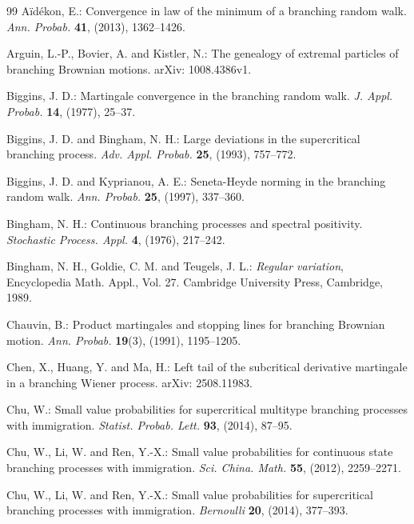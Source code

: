 \documentclass[11pt]{article}
\numberwithin{equation}{section}
\begin{document}
	
	\begin{singlespace}
		\small
		\begin{thebibliography}{99}
			A\"id\'ekon, E.: Convergence in law of the minimum of a branching random walk. \emph{Ann. Probab.} \textbf{41}, (2013), 1362--1426.
			
			Arguin, L.-P., Bovier, A. and Kistler, N.: The genealogy of extremal particles of branching Brownian motions.
			arXiv: 1008.4386v1.
			
			Biggins, J. D.: Martingale convergence in the branching random walk. \emph{J. Appl. Probab.} \textbf{14}, (1977), 25--37.
			
			  Biggins, J. D. and Bingham, N. H.: Large deviations in the supercritical branching process. \emph{Adv. Appl. Probab.} \textbf{25}, (1993), 757--772.
			
			Biggins, J. D. and Kyprianou, A. E.: Seneta-Heyde norming in the branching random walk. \emph{Ann. Probab.} \textbf{25}, (1997), 337--360.
			
			Bingham, N. H.: Continuous branching processes and spectral positivity. \emph{Stochastic Process. Appl.} \textbf{4}, (1976), 217--242.
			
			
			
			
			Bingham, N. H., Goldie, C. M. and Teugels, J. L.: \emph{Regular variation}, Encyclopedia Math. Appl., Vol. 27. Cambridge University Press, Cambridge, 1989.
			
			Chauvin, B.: Product martingales and stopping lines for branching Brownian motion. \emph{Ann. Probab.} \textbf{19}(3), (1991), 1195--1205.
			
			Chen, X., Huang, Y. and Ma, H.: Left tail of the subcritical derivative martingale in a branching Wiener process. 
			arXiv: 2508.11983.
			
			 Chu, W.: Small value probabilities for supercritical multitype
			branching processes with immigration. \emph{Statist. Probab. Lett.} \textbf{93}, (2014), 87--95.
			
			 Chu, W., Li, W. and Ren, Y.-X.: Small value probabilities for continuous state
			branching processes with immigration. \emph{Sci. China. Math.} \textbf{55}, (2012), 2259--2271. 
			
			 Chu, W., Li, W. and Ren, Y.-X.: Small value probabilities for supercritical
			branching processes with immigration. \emph{Bernoulli} \textbf{20}, (2014), 377--393. 
			

\end{thebibliography}
\end{singlespace}
\end{document}
